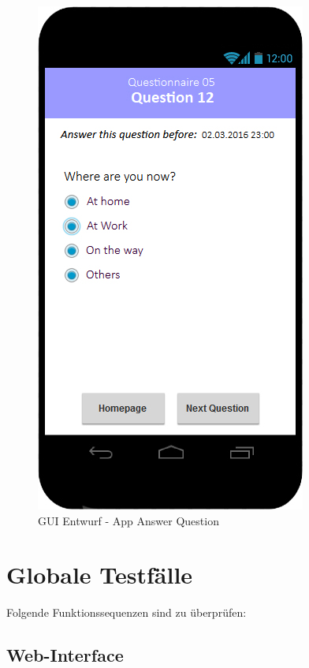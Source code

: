 \documentclass[a4paper]{scrreprt}
\begin{document}
            \vspace*{1cm}
            \begin{figure}[ht]
                \centering
                \includegraphics[scale = 0.3]{android_answer.jpg}
                \caption{GUI Entwurf - App Answer Question}
            \end{figure}

    \chapter{Globale Testfälle}

        Folgende Funktionssequenzen sind zu \"uberpr\"ufen:

        \section{Web-Interface}
\end{document}
